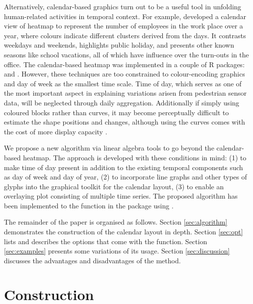 \documentclass[article]{jss}
\begin{document}
Alternatively, calendar-based graphics turn out to be a useful tool in
unfolding human-related activities in temporal context. For example,
\citet{VanWijkCluster1999} developed a calendar view of heatmap to
represent the number of employees in the work place over a year, where
colours indicate different clusters derived from the days. It contrasts
weekdays and weekends, highlights public holiday, and presents other
known seasons like school vacations, all of which have influence over
the turn-outs in the office. The calendar-based heatmap was implemented
in a couple of R packages:  \citep{R-ggTimeSeries} and
 \citep{R-ggcal}. However, these techniques are too
constrained to colour-encoding graphics and day of week as the smallest
time scale. Time of day, which serves as one of the most important
aspect in explaining variations arisen from pedestrian sensor data, will
be neglected through daily aggregation. Additionally if simply using
coloured blocks rather than curves, it may become perceptually difficult
to estimate the shape positions and changes, although using the curves
comes with the cost of more display capacity
\citep{cleveland1984graphical, lam2007overview}.

We propose a new algorithm via linear algebra tools to go beyond the
calendar-based heatmap. The approach is developed with these conditions
in mind: (1) to make time of day present in addition to the existing
temporal components such as day of week and day of year, (2) to
incorporate line graphs and other types of glyphs into the graphical
toolkit for the calendar layout, (3) to enable an overlaying plot
consisting of multiple time series. The proposed algorithm has been
implemented to the  function in the 
package \citep{R-sugrrants} using  \citep{R-base}.

The remainder of the paper is organised as follows. Section
\ref{sec:algorithm} demonstrates the construction of the calendar layout
in depth. Section \ref{sec:opt} lists and describes the options that
come with the  function. Section \ref{sec:examples}
presents some variations of its usage. Section \ref{sec:discussion}
discusses the advantages and disadvantages of the method.

\section{Construction}\label{construction}

\label{sec:algorithm}
\end{document}

